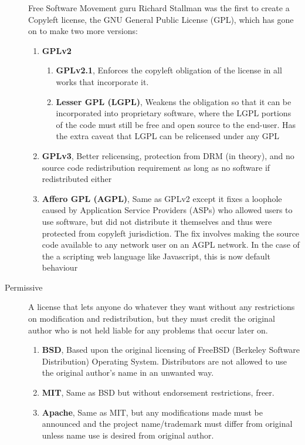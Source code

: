 \begin{description}
{Free Software Movement guru Richard Stallman was the first to create a Copyleft license, the GNU \citep{stallman1998gnu} General Public License (GPL), which has gone on to make two more versions:
	\begin{enumerate}
	\item{\textbf{GPLv2}
		\begin{enumerate}
		\item{\textbf{GPLv2.1}, Enforces the copyleft obligation of the license in all works that incorporate it.}
		\item{\textbf{Lesser GPL (LGPL)}, Weakens the obligation so that it can be incorporated into proprietary software, where the LGPL portions of the code must still be free and open source to the end-user. Has the extra caveat that LGPL can be relicensed under any GPL}
		\end{enumerate}
	}
	\item{\textbf{GPLv3}, Better relicensing, protection from DRM (in theory), and no source code redistribution requirement as long as no software if redistributed either \citep{gplv3}}
	\item{\textbf{Affero GPL (AGPL)}, Same as GPLv2 except it fixes a loophole caused by Application Service Providers (ASPs) who allowed users to use software, but did not distribute it themselves and thus were protected from copyleft jurisdiction. The fix involves making the source code available to any network user on an AGPL network. In the case of the a scripting web language like Javascript, this is now default behaviour\citep{agplv3}}
	\end{enumerate}
	}
\item[Permissive]{
A license that lets anyone do whatever they want without any restrictions on modification and redistribution, but they must credit the original author who is not held liable for any problems that occur later on.
	\begin{enumerate}
	\item{\textbf{BSD}, Based upon the original licensing of FreeBSD (Berkeley Software Distribution) Operating System. Distributors are not allowed to use the original author's name in an unwanted way.\citep{bsd}}
	\item{\textbf{MIT}, Same as BSD but without endorsement restrictions, freer.\citep{mit}}
	\item{\textbf{Apache}, Same as MIT, but any modifications made must be announced and the project name/trademark must differ from original unless name use is desired from original author.}
	\end{enumerate}
}
\end{description}




